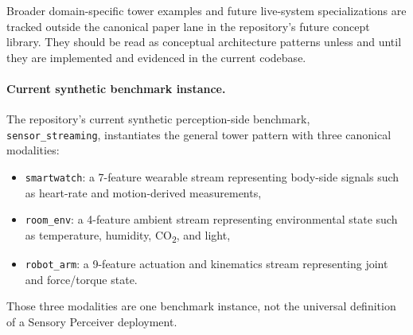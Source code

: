 \documentclass{article}
\begin{document}
Broader domain-specific tower examples and future live-system specializations are tracked outside the canonical paper lane in the repository's future concept library. They should be read as conceptual architecture patterns unless and until they are implemented and evidenced in the current codebase.

\paragraph{Current synthetic benchmark instance.}
The repository's current synthetic perception-side benchmark, \texttt{sensor\_streaming}, instantiates the general tower pattern with three canonical modalities:
\begin{itemize}[leftmargin=*]
  \item \texttt{smartwatch}: a 7-feature wearable stream representing body-side signals such as heart-rate and motion-derived measurements,
  \item \texttt{room\_env}: a 4-feature ambient stream representing environmental state such as temperature, humidity, CO\textsubscript{2}, and light,
  \item \texttt{robot\_arm}: a 9-feature actuation and kinematics stream representing joint and force/torque state.
\end{itemize}
Those three modalities are one benchmark instance, not the universal definition of a Sensory Perceiver deployment.
\end{document}

